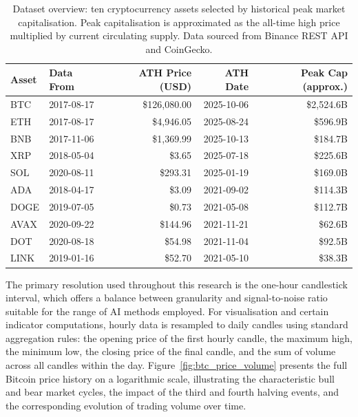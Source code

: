 \begin{table}[h!]
    \centering
    \caption{Dataset overview: ten cryptocurrency assets selected by historical peak market capitalisation. Peak capitalisation is approximated as the all-time high price multiplied by current circulating supply. Data sourced from Binance REST API and CoinGecko.}
    \label{tab:dataset_overview}
    \begin{tabular}{llrrr}
        \toprule
        \textbf{Asset} & \textbf{Data From} & \textbf{ATH Price (USD)} & \textbf{ATH Date} & \textbf{Peak Cap (approx.)} \\
        \midrule
        BTC  & 2017-08-17 & \$126,080.00 & 2025-10-06 & \$2,524.6B \\
        ETH  & 2017-08-17 & \$4,946.05   & 2025-08-24 & \$596.9B   \\
        BNB  & 2017-11-06 & \$1,369.99   & 2025-10-13 & \$184.7B   \\
        XRP  & 2018-05-04 & \$3.65       & 2025-07-18 & \$225.6B   \\
        SOL  & 2020-08-11 & \$293.31     & 2025-01-19 & \$169.0B   \\
        ADA  & 2018-04-17 & \$3.09       & 2021-09-02 & \$114.3B   \\
        DOGE & 2019-07-05 & \$0.73       & 2021-05-08 & \$112.7B   \\
        AVAX & 2020-09-22 & \$144.96     & 2021-11-21 & \$62.6B    \\
        DOT  & 2020-08-18 & \$54.98      & 2021-11-04 & \$92.5B    \\
        LINK & 2019-01-16 & \$52.70      & 2021-05-10 & \$38.3B    \\
        \bottomrule
    \end{tabular}
\end{table}


The primary resolution used throughout this research is the one-hour candlestick interval, which offers a balance between granularity and signal-to-noise ratio suitable for the range of AI methods employed. For visualisation and certain indicator computations, hourly data is resampled to daily candles using standard aggregation rules: the opening price of the first hourly candle, the maximum high, the minimum low, the closing price of the final candle, and the sum of volume across all candles within the day. Figure~\ref{fig:btc_price_volume} presents the full Bitcoin price history on a logarithmic scale, illustrating the characteristic bull and bear market cycles, the impact of the third and fourth halving events, and the corresponding evolution of trading volume over time.


